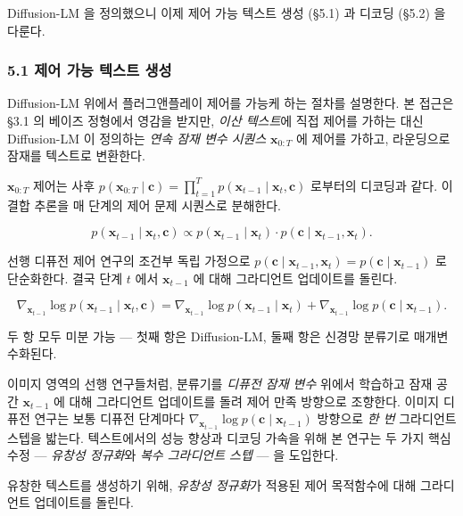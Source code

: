 \documentclass[
]{article}
\begin{document}
Diffusion-LM 을 정의했으니 이제 제어 가능 텍스트 생성 (§5.1) 과 디코딩
(§5.2) 을 다룬다.

\hypertarget{uxc81cuxc5b4-uxac00uxb2a5-uxd14duxc2a4uxd2b8-uxc0dduxc131}{%
\subsubsection{5.1 제어 가능 텍스트
생성}\label{uxc81cuxc5b4-uxac00uxb2a5-uxd14duxc2a4uxd2b8-uxc0dduxc131}}

Diffusion-LM 위에서 플러그앤플레이 제어를 가능케 하는 절차를 설명한다.
본 접근은 §3.1 의 베이즈 정형에서 영감을 받지만, \emph{이산 텍스트}에
직접 제어를 가하는 대신 Diffusion-LM 이 정의하는 \emph{연속 잠재 변수
시퀀스} \(\mathbf{x}_{0:T}\) 에 제어를 가하고, 라운딩으로 잠재를
텍스트로 변환한다.

\(\mathbf{x}_{0:T}\) 제어는 사후
\(p(\mathbf{x}_{0:T} \mid \mathbf{c}) = \prod_{t=1}^{T} p(\mathbf{x}_{t-1} \mid \mathbf{x}_t, \mathbf{c})\)
로부터의 디코딩과 같다. 이 결합 추론을 매 단계의 제어 문제 시퀀스로
분해한다.

\[
p(\mathbf{x}_{t-1} \mid \mathbf{x}_t, \mathbf{c}) \propto p(\mathbf{x}_{t-1} \mid \mathbf{x}_t) \cdot p(\mathbf{c} \mid \mathbf{x}_{t-1}, \mathbf{x}_t).
\]

선행 디퓨전 제어 연구의 조건부 독립 가정으로
\(p(\mathbf{c} \mid \mathbf{x}_{t-1}, \mathbf{x}_t) = p(\mathbf{c} \mid \mathbf{x}_{t-1})\)
로 단순화한다. 결국 단계 \(t\) 에서 \(\mathbf{x}_{t-1}\) 에 대해
그라디언트 업데이트를 돌린다.

\[
\nabla_{\mathbf{x}_{t-1}} \log p(\mathbf{x}_{t-1} \mid \mathbf{x}_t, \mathbf{c}) = \nabla_{\mathbf{x}_{t-1}} \log p(\mathbf{x}_{t-1} \mid \mathbf{x}_t) + \nabla_{\mathbf{x}_{t-1}} \log p(\mathbf{c} \mid \mathbf{x}_{t-1}).
\]

두 항 모두 미분 가능 --- 첫째 항은 Diffusion-LM, 둘째 항은 신경망
분류기로 매개변수화된다.

이미지 영역의 선행 연구들처럼, 분류기를 \emph{디퓨전 잠재 변수} 위에서
학습하고 잠재 공간 \(\mathbf{x}_{t-1}\) 에 대해 그라디언트 업데이트를
돌려 제어 만족 방향으로 조향한다. 이미지 디퓨전 연구는 보통 디퓨전
단계마다
\(\nabla_{\mathbf{x}_{t-1}} \log p(\mathbf{c} \mid \mathbf{x}_{t-1})\)
방향으로 \emph{한 번} 그라디언트 스텝을 밟는다. 텍스트에서의 성능 향상과
디코딩 가속을 위해 본 연구는 두 가지 핵심 수정 --- \emph{유창성
정규화}와 \emph{복수 그라디언트 스텝} --- 을 도입한다.

유창한 텍스트를 생성하기 위해, \emph{유창성 정규화}가 적용된 제어
목적함수에 대해 그라디언트 업데이트를 돌린다.
\end{document}
